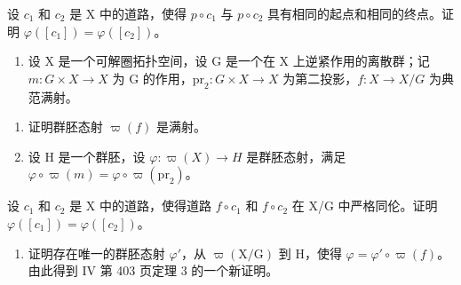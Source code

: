 设 \(c_{1}\) 和 \(c_{2}\) 是 X 中的道路，使得 \(p \circ c_{1}\) 与 \(p \circ c_{2}\) 具有相同的起点和相同的终点。证明 \(\varphi([c_{1}]) = \varphi([c_{2}])\)。

\begin{enumerate}
\def\labelenumi{\arabic{enumi})}
\setcounter{enumi}{6}
\tightlist
\item
  设 X 是一个可解圈拓扑空间，设 G 是一个在 X 上逆紧作用的离散群；记 \(m\colon G \times X \to X\) 为 G 的作用，\(\mathrm{pr}_2\colon G \times X \to X\) 为第二投影，\(f\colon X \to X / G\) 为典范满射。
\end{enumerate}

\begin{enumerate}
\def\labelenumi{\alph{enumi})}
\item
  证明群胚态射 \(\varpi(f)\) 是满射。
\item
  设 H 是一个群胚，设 \(\varphi\colon\varpi(X)\to H\) 是群胚态射，满足 \(\varphi\circ\varpi(m)=\varphi\circ\varpi(\mathrm{pr}_{2})\)。
\end{enumerate}

设 \(c_{1}\) 和 \(c_{2}\) 是 X 中的道路，使得道路 \(f \circ c_{1}\) 和 \(f \circ c_{2}\) 在 X/G 中严格同伦。证明 \(\varphi([c_{1}]) = \varphi([c_{2}])\)。

\begin{enumerate}
\def\labelenumi{\alph{enumi})}
\setcounter{enumi}{2}
\tightlist
\item
  证明存在唯一的群胚态射 \(\varphi'\)，从 \(\varpi(\mathrm{X/G})\) 到 H，使得 \(\varphi = \varphi' \circ \varpi(f)\)。由此得到 IV 第 403 页定理 3 的一个新证明。
\end{enumerate}

